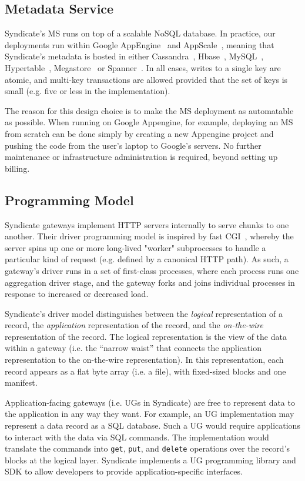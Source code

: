 \subsection{Metadata Service}

Syndicate's MS runs on top of a scalable NoSQL database.  In practice, our
deployments run within Google AppEngine~\cite{google-appengine} and
AppScale~\cite{appscale}, meaning that
Syndicate's metadata is hosted in either Cassandra~\cite{cassandra},
Hbase~\cite{hbase}, MySQL~\cite{mysql}, Hypertable~\cite{hypertable}, Megastore~\cite{megastore} or
Spanner~\cite{spanner}.  In all cases, writes to a single key are atomic, and
multi-key transactions are allowed provided that the set of keys is small (e.g.
five or less in the implementation).

The reason for this design choice is to make the MS deployment as automatable as
possible.  When running on Google Appengine, for example, deploying an MS from
scratch can be done simply by creating a new Appengine project and pushing the
code from the user's laptop to Google's servers.  No further maintenance or
infrastructure administration is required, beyond setting up billing.

\subsection{Programming Model}

Syndicate gateways implement HTTP servers internally to serve chunks to one
another.  Their driver programming model is inspired by fast CGI~\cite{fastcgi},
whereby the server spins up one or more long-lived "worker" subprocesses to
handle a particular kind of request (e.g. defined by a canonical HTTP path).
As such, a gateway's driver runs in a set of first-class processes, where each
process runs one aggregation driver stage, and the gateway forks and joins
individual processes in response to increased or decreased load.

Syndicate's driver model distinguishes between the \emph{logical} representation of a record,
the \emph{application} representation of the record, and the 
\emph{on-the-wire} representation of the record.  The logical representation is
the view of the data within a gateway (i.e. the ``narrow waist'' that connects
the application representation to the on-the-wire representation).  In this
representation, each record appears as a flat byte array (i.e. a file), with
fixed-sized blocks and one manifest.

Application-facing gateways (i.e. UGs in Syndicate) are free to represent data 
to the application in any way they want.  For example, an UG implementation
may represent a data record as a
SQL database.  Such a UG would require applications to interact with the data
via SQL commands.  The implementation would translate the commands into
\texttt{get}, \texttt{put}, and \texttt{delete} operations over the record's
blocks at the logical layer.  Syndicate implements a UG programming library and
SDK to allow developers to provide application-specific interfaces.

